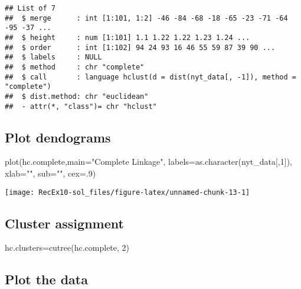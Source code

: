 \documentclass[
]{article}
\newenvironment{Shaded}{\begin{snugshade}}{\end{snugshade}}
\newcommand{\AttributeTok}[1]{\textcolor[rgb]{0.77,0.63,0.00}{#1}}
\newcommand{\DecValTok}[1]{\textcolor[rgb]{0.00,0.00,0.81}{#1}}
\newcommand{\FunctionTok}[1]{\textcolor[rgb]{0.00,0.00,0.00}{#1}}
\newcommand{\NormalTok}[1]{#1}
\newcommand{\OtherTok}[1]{\textcolor[rgb]{0.56,0.35,0.01}{#1}}
\newcommand{\StringTok}[1]{\textcolor[rgb]{0.31,0.60,0.02}{#1}}
\begin{document}
\begin{verbatim}
## List of 7
##  $ merge      : int [1:101, 1:2] -46 -84 -68 -18 -65 -23 -71 -64 -95 -37 ...
##  $ height     : num [1:101] 1.1 1.22 1.22 1.23 1.24 ...
##  $ order      : int [1:102] 94 24 93 16 46 55 59 87 39 90 ...
##  $ labels     : NULL
##  $ method     : chr "complete"
##  $ call       : language hclust(d = dist(nyt_data[, -1]), method = "complete")
##  $ dist.method: chr "euclidean"
##  - attr(*, "class")= chr "hclust"
\end{verbatim}

\hypertarget{plot-dendograms}{%
\subsection{Plot dendograms}\label{plot-dendograms}}

\begin{Shaded}
\begin{Highlighting}[]
\FunctionTok{plot}\NormalTok{(hc.complete,}\AttributeTok{main=}\StringTok{"Complete Linkage"}\NormalTok{, }\AttributeTok{labels=}\FunctionTok{as.character}\NormalTok{(nyt\_data[,}\DecValTok{1}\NormalTok{]), }
     \AttributeTok{xlab=}\StringTok{""}\NormalTok{, }\AttributeTok{sub=}\StringTok{""}\NormalTok{, }\AttributeTok{cex=}\NormalTok{.}\DecValTok{9}\NormalTok{)}
\end{Highlighting}
\end{Shaded}

\begin{center}\texttt{[image: RecEx10-sol\_files/figure-latex/unnamed-chunk-13-1]} \end{center}

\hypertarget{cluster-assignment}{%
\subsection{Cluster assignment}\label{cluster-assignment}}

\begin{Shaded}
\begin{Highlighting}[]
\NormalTok{hc.clusters}\OtherTok{=}\FunctionTok{cutree}\NormalTok{(hc.complete, }\DecValTok{2}\NormalTok{)}
\end{Highlighting}
\end{Shaded}

\hypertarget{plot-the-data-1}{%
\subsection{Plot the data}\label{plot-the-data-1}}
\end{document}
